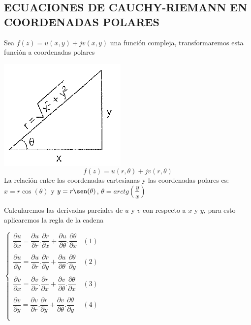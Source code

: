 \documentclass[10pt,a4paper]{book}
\begin{document}
\subsection{ECUACIONES DE CAUCHY-RIEMANN EN COORDENADAS POLARES}
 Sea $f(z) = u(x,y) +jv(x,y)$ una función compleja, transformaremos esta función a coordenadas polares
 \begin{multicols}{2}
 \includegraphics[scale=0.8]{pitagoras.png} \\
 \begin{equation}
  f(z) = u(r,\theta) + j v(r,\theta)
 \end{equation}
 La relación entre las coordenadas cartesianas y las coordenadas polares es: $x=r \cos(\theta)$ y $y=r \sen(\theta)$, $\theta = arctg(\dfrac{y}{x})$ 
 \end{multicols}
 Calcularemos las derivadas parciales de $u$ y $v$ con respecto a $x$ y $y$, para esto aplicaremos la regla de la cadena 
 \begin{center}
  $\displaystyle \left\{ 
  \begin{array}{lcr}
   \dfrac{\partial u}{\partial x} = \dfrac{\partial u}{\partial r} . \dfrac{\partial r}{\partial x} + \dfrac{\partial u}{\partial \theta} . \dfrac{\partial \theta}{\partial x} & (1)\\ \\
   \dfrac{\partial u}{\partial y} = \dfrac{\partial u}{\partial r} . \dfrac{\partial r}{\partial y} + \dfrac{\partial u}{\partial \theta} . \dfrac{\partial \theta}{\partial y} & (2)\\ \\
   \dfrac{\partial v}{\partial x} = \dfrac{\partial v}{\partial r} . \dfrac{\partial r}{\partial x} + \dfrac{\partial v}{\partial \theta} . \dfrac{\partial \theta}{\partial x} & (3)\\ \\
   \dfrac{\partial v}{\partial y} = \dfrac{\partial v}{\partial r} . \dfrac{\partial r}{\partial y} + \dfrac{\partial v}{\partial \theta} . \dfrac{\partial \theta}{\partial y} & (4)\\ \\ 
   \end{array}   
\right.$
 \end{center}
\end{document}
